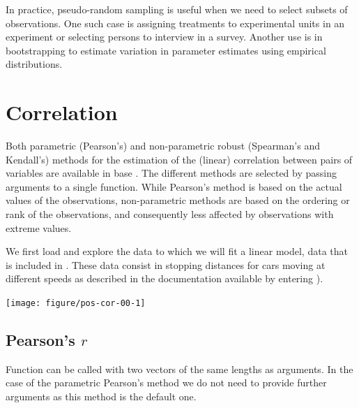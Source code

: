 \documentclass[krantz2]{krantz}\usepackage{knitr}%
\begin{document}
In practice, pseudo-random sampling is useful when we need to select subsets of observations. One such case is  assigning treatments to experimental units in an experiment or selecting persons to interview in a survey. Another use is in bootstrapping to estimate variation in parameter estimates using empirical distributions.

\section{Correlation}

Both parametric (Pearson's) and non-parametric robust (Spearman's and Kendall's) methods for the estimation of the (linear) correlation between pairs of variables are available in base \Rlang. The different methods are selected by passing arguments to a single function. While Pearson's method is based on the actual values of the observations, non-parametric methods are based on the ordering or rank of the observations, and consequently less affected by observations with extreme values.

We first load and explore the data to which we will fit a linear model, data that is included in \Rpgrm. These data consist in stopping distances for cars moving at different speeds as described in the documentation available by entering ).

\begin{knitrout}\footnotesize
{}\color{fgcolor}\begin{kframe}
\begin{alltt}
\end{alltt}
\end{kframe}

{\centering \texttt{[image: figure/pos-cor-00-1]} 

}



\end{knitrout}
\label{chunk:plot:cars}

\subsection{Pearson's $r$}

Function  can be called with two vectors of the same lengths as arguments. In the case of the parametric Pearson's method we do not need to provide further arguments as this method is the default one.
\end{document}
